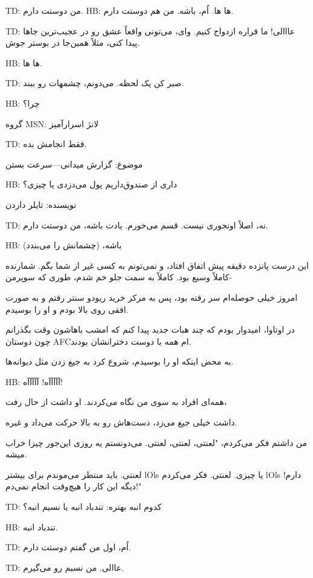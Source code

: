 
\noindent TD: من دوستت دارم.  
\LTR
HB: ها ها. اُم، باشه. من هم دوستت دارم.  

\LTR 
TD: عااالی! ما قراره ازدواج کنیم. وای، می‌تونی واقعاً عشق رو در عجیب‌ترین جاها پیدا کنی، مثلاً همین‌جا در بوستر جوش.  

\LTR 
HB: ها ها.  

\LTR 
TD: صبر کن یک لحظه. می‌دونم، چشمهات رو ببند.  

\LTR 
HB: چرا؟  

گروه MSN: لانژ اسرارآمیز

\LTR 
TD: فقط انجامش بده.  

موضوع: گزارش میدانی—سرعت بستن

\LTR 
HB: داری از صندوق‌داریم پول می‌دزدی یا چیزی؟  

نویسنده: تایلر داردن

\LTR 
TD: نه، اصلاً اونجوری نیست. قسم می‌خورم. یادت باشه، من دوستت دارم.  

\LTR 
HB: باشه، (چشمانش را می‌بندد)  

این درست پانزده دقیقه پیش اتفاق افتاد، و نمی‌تونم به کسی غیر از شما بگم. شمارنده کاملاً وسیع بود. کاملاً به سمت جلو خم شدم، طوری که سوپرمن-  

امروز خیلی حوصله‌ام سر رفته بود، پس به مرکز خرید ریودو سنتر رفتم و به صورت افقی روی بالا بودم و او را بوسیدم.  

در اوتاوا، امیدوار بودم که چند هبات جدید پیدا کنم که امشب باهاشون وقت بگذرانم چون دوستان AFC‌ام همه با دوست دخترانشان بودند.  

به محض اینکه او را بوسیدم، شروع کرد به جیغ زدن مثل دیوانه‌ها.  

\LTR 
HB: آآآآآه! آآآآآه!  

\LTR 
همه‌ای افراد به سوی من نگاه می‌کردند. او داشت از حال رفت،  

داشت خیلی جیغ می‌زد، دست‌هاش رو به بالا حرکت می‌داد و غیره.  

من داشتم فکر می‌کردم، "لعنتی، لعنتی، لعنتی. می‌دونستم یه روزی این‌جور چیزا خراب میشه.  

لعنتی. باید منتظر می‌موندم برای بیشتر lOls یا چیزی. لعنتی. فکر می‌کردم lOls دارم! دیگه این کار را هیچ‌وقت انجام نمی‌دم!"  

\LTR 
TD: کدوم انبه بهتره: تندباد انبه یا نسیم انبه؟  

\LTR 
HB: تندباد انبه.  

\LTR 
TD: اُم، اول من گفتم دوستت دارم.  

\LTR 
TD: عاالی. من نسیم رو می‌گیرم.  

